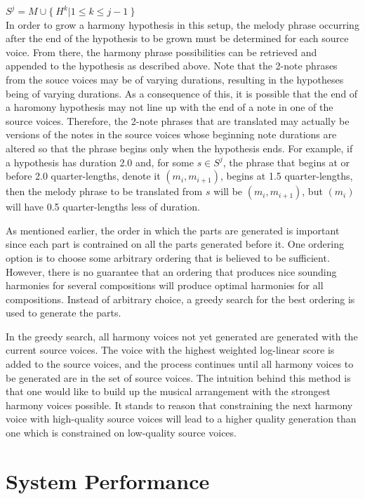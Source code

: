 \documentclass{sig-alternate}
\begin{document}
$S^{j} = {M} \cup \{\ H^k | 1 \leq k \leq j- 1\ \} $\\

In order to grow a harmony hypothesis in this setup, the melody phrase occurring after the end of the hypothesis to be grown must be determined for each source voice. From there, the harmony phrase possibilities can be retrieved and appended to the hypothesis as described above. Note that the 2-note phrases from the souce voices may be of varying durations, resulting in the hypotheses being of varying durations. As a consequence of this, it is possible that the end of a haromony hypothesis may not line up with the end of a note in one of the source voices. Therefore, the 2-note phrases that are translated may actually be versions of the notes in the source voices whose beginning note durations are altered so that the phrase begins only when the hypothesis ends. For example, if a hypothesis has duration 2.0 and, for some $s \in S^{j}$, the phrase that begins at or before 2.0 quarter-lengths, denote it $(m_{i}, m_{i + 1})$, begins at 1.5 quarter-lengths, then the melody phrase to be translated from $s$ will be $(m_{i}, m_{i + 1})$, but $(m_{i})$ will have 0.5 quarter-lengths less of duration. 

As mentioned earlier, the order in which the parts are generated is important since each part is contrained on all the parts generated before it. One ordering option is to choose some arbitrary ordering that is believed to be sufficient. However, there is no guarantee that an ordering that produces nice sounding harmonies for several compositions will produce optimal harmonies for all compositions. Instead of arbitrary choice, a greedy search for the best ordering is used to generate the parts.

In the greedy search, all harmony voices not yet generated are generated with the current source voices. The voice with the highest weighted log-linear score is added to the source voices, and the process continues until all harmony voices to be generated are in the set of source voices. The intuition behind this method is that one would like to build up the musical arrangement with the strongest harmony voices possible.
It stands to reason that constraining the next harmony voice with high-quality source voices will lead to a higher quality generation than one which is constrained on low-quality source voices.

\section{System Performance}
\label{sec:sys_perform}
\end{document}
